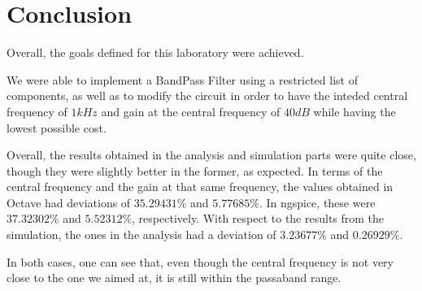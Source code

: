 \section{Conclusion}
\label{sec:conclusion}


Overall, the goals defined for this laboratory were achieved.

We were able to implement a BandPass Filter using a restricted list of components, as well as to modify the circuit in order to have the inteded central frequency of $1kHz$ and gain at the central frequency of $40 dB$ while having the lowest possible cost.

Overall, the results obtained in the analysis and simulation parts were quite close, though they were slightly better in the former, as expected. In terms of the central frequency and the gain at that same frequency, the values obtained in Octave had deviations of $35.29431 \%$ and $5.77685 \%$. In ngspice, these were $37.32302\%$ and $5.52312 \%$, respectively. With respect to the results from the simulation, the ones in the analysis had a deviation of $3.23677\%$ and $0.26929\%$.


In both cases, one can see that, even though the central frequency is not very close to the one we aimed at, it is still within the passaband range.
